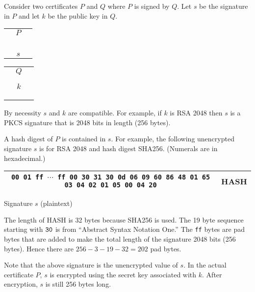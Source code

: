 \documentclass[12pt]{article}
\begin{document}
\noindent
Consider two certificates $P$ and $Q$ where $P$ is signed by $Q$.
Let $s$ be the signature in $P$ and let $k$ be the public
key in $Q$.

\begin{center}
\begin{tabular}{|c|}
\hline
$\quad P\quad$\\
\\
\\
\\
\\
\\
\hline
$s$\\
\hline
\end{tabular}
\qquad
\begin{tabular}{|c|}
\hline
$\quad Q\quad$\\
\\
\\
\hline
$k$\\
\hline
\\
\\
\\
\hline
\end{tabular}
\end{center}

\noindent
By necessity $s$ and $k$ are compatible.
For example, if $k$ is RSA 2048 then $s$ is a PKCS signature that is 2048 bits in length
(256 bytes).

\bigskip
\noindent
A hash digest of $P$ is contained in $s$.
For example, the following unencrypted signature $s$ is for RSA 2048 and hash digest SHA256.
(Numerals are in hexadecimal.)

\begin{center}
\begin{tabular}{|c|c|}
\hline
{\footnotesize\tt 00 01 ff $\cdots$ ff 00 30 31 30 0d 06 09 60 86 48 01 65 03 04 02 01 05 00 04 20} & HASH\\
\hline
\end{tabular}

\medskip
Signature $s$ (plaintext)
\end{center}

\noindent
The length of HASH is 32 bytes because SHA256 is used.
The 19 byte sequence starting with $\tt 30$ is from
``Abstract Syntax Notation One.''
The {\tt ff} bytes are pad bytes that are added to make the total length of the signature 2048 bits (256 bytes).
Hence there are $256-3-19-32=202$ pad bytes.

\bigskip
\noindent
Note that the above signature is the unencrypted value of $s$.
In the actual certificate $P$, $s$ is encrypted using the secret key associated with $k$.
After encryption, $s$ is still 256 bytes long.
\end{document}
